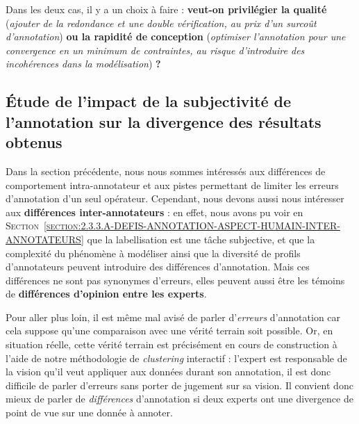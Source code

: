 			\begin{leftBarAuthorOpinion}
				Dans les deux cas, il y a un choix à faire : \textbf{veut-on privilégier la qualité} (\textit{ajouter de la redondance et une double vérification, au prix d'un surcoût d'annotation}) \textbf{ou la rapidité de conception} (\textit{optimiser l'annotation pour une convergence en un minimum de contraintes, au risque d'introduire des incohérences dans la modélisation}) \textbf{?}
			\end{leftBarAuthorOpinion}
		
	\subsection{Étude de l'impact de la subjectivité de l'annotation sur la divergence des résultats obtenus}
	\label{section:4.6.3-ETUDE-ROBUSTESSE-SUBJECTIVITE-ANNOTATION-ET-DIVERGENCE}
		
		Dans la section précédente, nous nous sommes intéressés aux différences de comportement intra-annotateur et aux pistes permettant de limiter les erreurs d'annotation d'un seul opérateur.
		Cependant, nous devons aussi nous intéresser aux \textbf{différences inter-annotateurs} :
		en effet, nous avons pu voir en \textsc{Section~\ref{section:2.3.3.A-DEFIS-ANNOTATION-ASPECT-HUMAIN-INTER-ANNOTATEURS}} que la labellisation est une tâche subjective, et que la complexité du phénomène à modéliser ainsi que la diversité de profils d'annotateurs peuvent introduire des différences d'annotation.
		Mais ces différences ne sont pas synonymes d'erreurs, elles peuvent aussi être les témoins de \textbf{différences d'opinion entre les experts}.
		\begin{leftBarAuthorOpinion}
			Pour aller plus loin, il est même mal avisé de parler d'\textit{erreurs} d'annotation car cela suppose qu'une comparaison avec une vérité terrain soit possible.
			Or, en situation réelle, cette vérité terrain est précisément en cours de construction à l'aide de notre méthodologie de \textit{clustering} interactif : l'expert est responsable de la vision qu'il veut appliquer aux données durant son annotation, il est donc difficile de parler d'erreurs sans porter de jugement sur sa vision.
			Il convient donc mieux de parler de \textit{différences} d'annotation si deux experts ont une divergence de point de vue sur une donnée à annoter.
		\end{leftBarAuthorOpinion}
		
